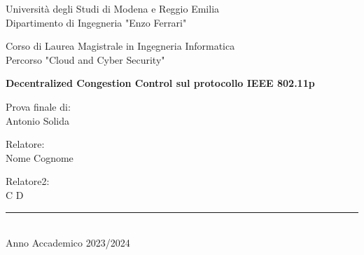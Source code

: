 \thispagestyle{plain}

\begin{titlepage}
    \begin{center}

		Università degli Studi di Modena e Reggio Emilia\\
		\large
		Dipartimento di Ingegneria "Enzo Ferrari"

        \vspace{2.5cm}
        
		\Large
		Corso di Laurea Magistrale in Ingegneria Informatica\\
		
		\large
		Percorso "Cloud and Cyber Security"		
		
		\vspace{2.5cm}
        
        \Huge
        \textbf{Decentralized Congestion Control sul protocollo IEEE 802.11p}

        \vspace{3cm}

		\large
		

		\begin{flushright}
		Prova finale di:\\
		Antonio Solida
		\end{flushright}		        
        
        
		\Large        
        \vspace{3cm}
        
        \begin{flushleft}
        Relatore:\\
        Nome Cognome
        \end{flushleft}
                
        \begin{flushleft}
        Relatore2:\\
        C D
        \end{flushleft}
            
		\vfill
		
		\rule{300pt}{0.2pt}\\
		\small
		Anno Accademico 2023/2024
            
    \end{center}
\end{titlepage}